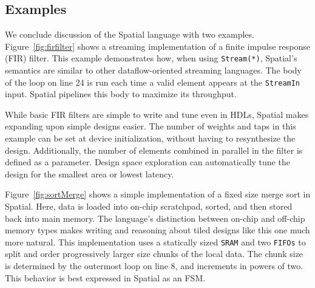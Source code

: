 \subsection{Examples}





We conclude discussion of the Spatial language with two examples.
Figure~\ref{fig:firfilter} shows a streaming implementation of a finite impulse response (FIR) filter.
This example demonstrates how, when using \texttt{\small{Stream(*)}}, Spatial's semantics are similar to other dataflow-oriented streaming languages. The body of the loop on line 24 is run each time a valid element appears at the \texttt{\small{StreamIn}} input. Spatial pipelines this body to maximize its throughput.

While basic FIR filters are simple to write and tune even in HDLs, Spatial makes expanding upon simple designs easier. The number of weights and taps in this example can be set at device initialization, without having to resynthesize the design. Additionally, the number of elements combined in parallel in the filter is defined as a parameter. Design space exploration can automatically tune the design for the smallest area or lowest latency.

Figure~\ref{fig:sortMerge} shows a simple implementation of a fixed size merge sort in Spatial. Here, data is loaded into on-chip scratchpad, sorted, and then stored back into main memory.
The language's distinction between on-chip and off-chip memory types makes writing and reasoning about tiled designs like this one much more natural.
This implementation uses a statically sized \texttt{\small{SRAM}} and two \texttt{\small{FIFOs}} to split and order progressively larger size chunks of the local data.
The chunk size is determined by the outermost loop on line 8, and increments in powers of two. This behavior is best expressed in Spatial as an FSM.
